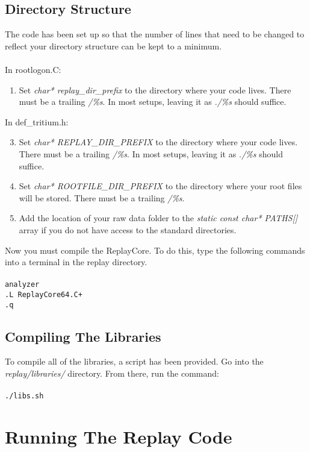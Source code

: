 \documentclass{report}
\begin{document}
\section{Directory Structure}
The code has been set up so that the number of lines that need to be changed to reflect your directory structure can be kept to a minimum.
\\\\
\noindent In rootlogon.C:
\begin{enumerate}
\item Set \textit{char* replay\_dir\_prefix} to the directory where your code lives. There must be a trailing \textit{/\%s}. In most setups, leaving it as \textit{./\%s} should suffice.
\end{enumerate}
In def\_tritium.h:
\begin{enumerate}
\setcounter{enumi}{2}
\item Set \textit{char* REPLAY\_DIR\_PREFIX} to the directory where your code lives. There must be a trailing \textit{/\%s}. In most setups, leaving it as \textit{./\%s} should suffice.
\item Set \textit{char* ROOTFILE\_DIR\_PREFIX} to the directory where your root files will be stored. There must be a trailing \textit{/\%s}.
\item Add the location of your raw data folder to the \textit{static const char* PATHS[]} array if you do not have access to the standard directories.
\end{enumerate}

Now you must compile the ReplayCore. To do this, type the following commands into a terminal in the replay directory.
\\\\
\texttt{analyzer\\
.L ReplayCore64.C+\\
.q}

\section{Compiling The Libraries}

To compile all of the libraries, a script has been provided. Go into the \textit{replay/libraries/} directory. From there, run the command:\\\\
\texttt{./libs.sh}

\chapter{Running The Replay Code}
\end{document}
